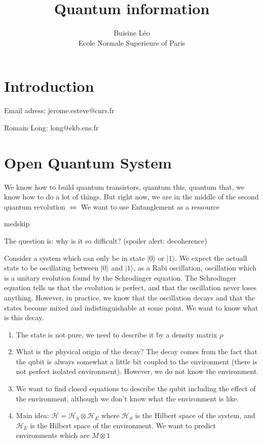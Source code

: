 \documentclass[a4paper]{book}
\theoremstyle{definition}
\theoremstyle{remark}
\begin{document}
\title{Quantum information}
\author{Buisine Léo\\Ecole Normale Superieure of Paris}
\maketitle

\tableofcontents

\chapter{Introduction}

Email adress: jerome.esteve@cnrs.fr \newline 

Romain Long: long@ekb.ens.fr

\chapter{Open Quantum System}

We know how to build quantum transistors, quantum this, quantum that, we know how to do a lot of things. But right now, we are in the middle of the second quantum revolution $\Leftrightarrow$ We want to use Entanglement as a ressource \par medskip 

The question is: why is it so difficult? (spoiler alert: decoherence) \par \medskip 

Consider a system which can only be in state $|0\rangle$ or $|1\rangle$. We expect the actuall state to be oscillating between $|0\rangle$ and $|1\rangle$, as a Rabi oscillation, oscillation which is a unitary evolution found by the Schrodinger equation. The Schrodinger equation tells us that the evolution is perfect, and that the oscillation never loses anything. However, in practice, we know that the oscillation decays and that the states become mixed and indistinguishable at some point. We want to know what is this decay. \par \bigskip 

\begin{enumerate}
    \item The state is not pure, we need to describe it by a density matrix $\rho$
    \item What is the physical origin of the decay? The decay comes from the fact that the qubit is always somewhat a little bit coupled to the environment (there is not perfect isolated environment). However, we do not know the environment. 
    \item We want to find closed equations to describe the qubit including the effect of the environment, although we don't know what the environment is like. 
    \item Main idea: $\mathscr{H} = \mathscr{H}_S \otimes \mathscr{H}_E$ where $\mathscr{H}_S$ is the Hilbert space of the system, and $\mathscr{H}_E$ is the Hilbert space of the environment. We want to predict environments which are $M \otimes 1$
\end{enumerate}
\end{document}

